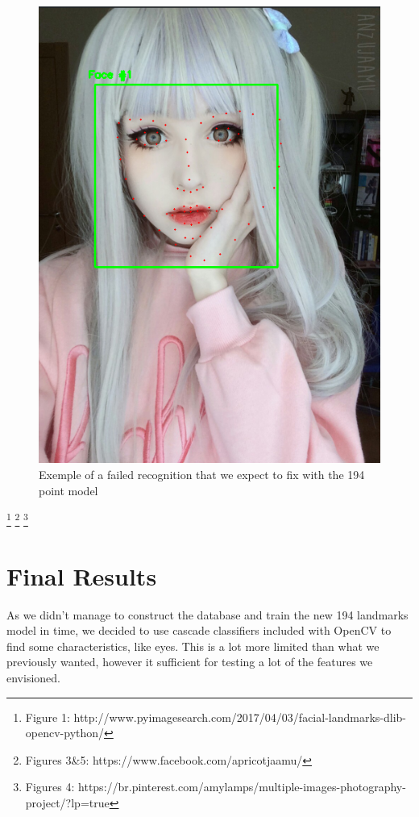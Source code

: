 \documentclass[12pt,a4paper]{article}
\begin{document}
    \begin{figure}[!ht]
        \centering
        \includegraphics[scale=0.5]{AnzuscWrong.png}
        \caption{Exemple of a failed recognition that we expect to fix with the 194 point model}
        \label{Anzu2}
    \end{figure}
    
    \footnote{Figure 1: http://www.pyimagesearch.com/2017/04/03/facial-landmarks-dlib-opencv-python/}
    \footnote{Figures 3\&5: https://www.facebook.com/apricotjaamu/}
    \footnote{Figures 4: https://br.pinterest.com/amylamps/multiple-images-photography-project/?lp=true}
    
\newpage

\section{Final Results}
    As we didn't manage to construct the database and train the new 194 landmarks model in time, we decided to use cascade classifiers included with OpenCV to find some characteristics, like eyes. This is a lot more limited than what we previously wanted, however it sufficient for testing a lot of the features we envisioned.
\end{document}
